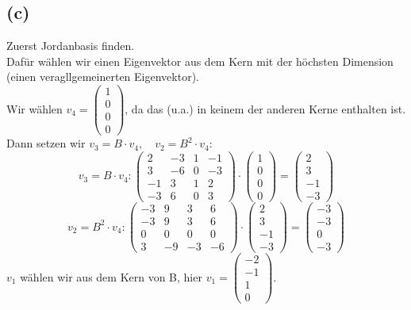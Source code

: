 \documentclass{article} %
\begin{document}
\subsection*{(c)}
Zuerst Jordanbasis finden. \\
Dafür wählen wir einen Eigenvektor aus dem Kern mit der höchsten Dimension (einen veragllgemeinerten Eigenvektor).  \\
Wir wählen $v_4 = \begin{pmatrix}
1\\0\\0\\0
\end{pmatrix}$, da das (u.a.) in keinem der anderen Kerne enthalten ist. Dann setzen wir $v_3 = B \cdot v_4, \quad v_2 = B^2 \cdot v_4$: 
\[
v_3 = B \cdot v_4 : \begin{pmatrix}
2 & -3 & 1 & -1 \\
3 & -6 & 0 & -3 \\
-1 & 3 & 1 & 2 \\
-3 & 6 & 0 & 3
\end{pmatrix} \cdot  \begin{pmatrix}
1\\0\\0\\0
\end{pmatrix}  = \begin{pmatrix}
 2\\3\\-1\\-3
\end{pmatrix}
\]
\[
v_2 = B^2 \cdot v_4 : \begin{pmatrix}
-3 & 9 & 3 & 6 \\
-3 & 9 & 3 & 6 \\
0 & 0 & 0 & 0 \\
3 & -9 & -3 & -6
\end{pmatrix} \cdot  \begin{pmatrix}
 2\\3\\-1\\-3
\end{pmatrix}  = \begin{pmatrix}
-3\\-3\\0\\-3
\end{pmatrix}
\]
$v_1$ wählen wir aus dem Kern von B, hier $v_1 = \begin{pmatrix}
-2 \\ -1 \\ 1 \\0 
\end{pmatrix}$. \\
\end{document}
